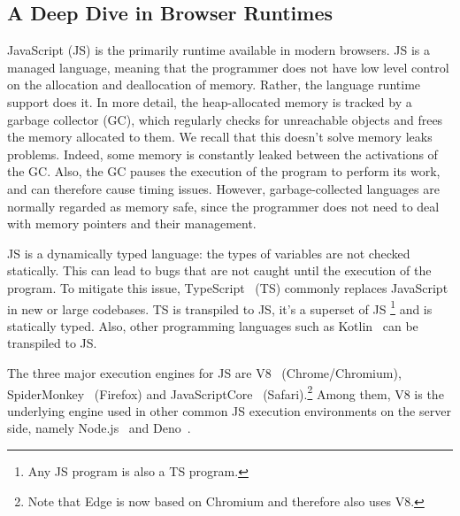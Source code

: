\subsection{A Deep Dive in Browser Runtimes}\label{sc:browser-runtimes}

JavaScript (JS) is the primarily runtime available in modern browsers.
JS is a managed language, meaning that the programmer
does not have low level control on the allocation and
deallocation of memory. Rather, the language runtime support does it.
In more detail, the heap-allocated memory
is tracked by a garbage collector (GC), which regularly
checks for unreachable objects and frees the memory allocated
to them. We recall that this doesn't solve memory leaks
problems. Indeed, some memory is constantly leaked
between the activations of the GC. Also, the GC
pauses the execution of the program to perform its work,
and can therefore cause timing issues. However, garbage-collected
languages are normally regarded as memory safe, since
the programmer does not need to deal with memory pointers
and their management.


JS is a dynamically
typed language: the types of variables are not checked
statically. This can lead to bugs that are not caught
until the execution of the program.
To mitigate this issue, TypeScript~\cite{bierman2014understanding} (TS)
commonly replaces JavaScript in new or large codebases.
TS is transpiled to JS, it's a superset of JS
\footnote{Any JS program is also a TS program.}
and is statically typed.
Also, other programming languages such as
Kotlin~\cite{KotlinToJs} can be transpiled to JS.

The three major execution engines for JS are V8~\cite{V8} (Chrome/Chromium),
SpiderMonkey~\cite{SpiderMonkey} (Firefox) and JavaScriptCore~\cite{JavaScriptCore} (Safari).\footnote{Note that Edge is now based on Chromium and therefore
also uses V8.}
Among them, V8 is the underlying engine used in other
common JS execution environments on the server side, 
namely Node.js~\cite{NodeJS} and Deno~\cite{Deno}.


